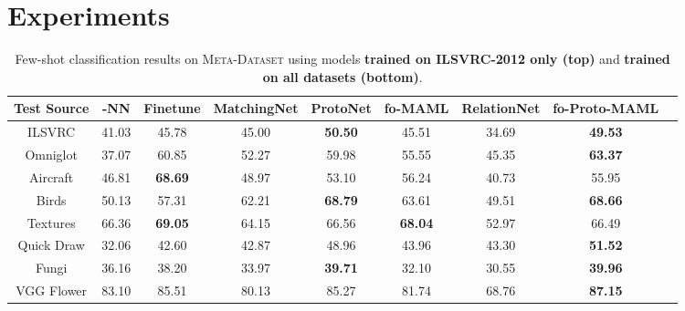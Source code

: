 \documentclass{article} \usepackage{iclr2020_conference,times}
\newcommand{\benchmark}{\textsc{Meta-Dataset}\xspace}
\begin{document}
\section{Experiments}

\begin{table*}[t]
\scriptsize
\centering
\caption{Few-shot classification results on \benchmark using models \textbf{trained on ILSVRC-2012 only (top)} and \textbf{trained on all datasets (bottom)}.}
\label{tab:iclr2020_tables_without_ci}
\begin{tabular}{|c|c|c|c|c|c|c|c|c|}
\hline
Test Source                 & -NN               & Finetune               & MatchingNet               & ProtoNet               & fo-MAML               & RelationNet                & fo-Proto-MAML \\\hline\hline
ILSVRC                      & 41.03                & 45.78                  & 45.00                     & \bf{50.50}             & 45.51                 & 34.69                      & \bf{49.53}        \\\hline
Omniglot                    & 37.07                & 60.85                  & 52.27                     & 59.98                  & 55.55                 & 45.35                      & \bf{63.37}        \\\hline
Aircraft                    & 46.81                & \bf{68.69}             & 48.97                     & 53.10                  & 56.24                 & 40.73                      & 55.95             \\\hline
Birds                       & 50.13                & 57.31                  & 62.21                     & \bf{68.79}             & 63.61                 & 49.51                      & \bf{68.66}        \\\hline
Textures                    & 66.36                & \bf{69.05}             & 64.15                     & 66.56                  & \bf{68.04}            & 52.97                      & 66.49             \\\hline
Quick Draw                  & 32.06                & 42.60                  & 42.87                     & 48.96                  & 43.96                 & 43.30                      & \bf{51.52}        \\\hline
Fungi                       & 36.16                & 38.20                  & 33.97                     & \bf{39.71}             & 32.10                 & 30.55                      & \bf{39.96}        \\\hline
VGG Flower                  & 83.10                & 85.51                  & 80.13                     & 85.27                  & 81.74                 & 68.76                      & \bf{87.15}        \\\hline

\end{tabular}
\end{table*}
\end{document}
